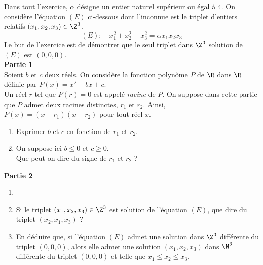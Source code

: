 \documentclass[a4paper,10pt,exos]{nsi}
\begin{document}
    \maketitle


    Dans tout l’exercice, $\alpha$ désigne un entier naturel supérieur ou égal à 4.
    On considère l’équation $(E)$ ci-dessous dont l’inconnue est le triplet d’entiers relatifs $(x_1, x_2, x_3) \in\Z^3$.
    $$(E): \quad x_1^2+x_2^2+x_3^2=\alpha x_1 x_2 x_3$$
    Le but de l’exercice est de démontrer que le seul triplet dans $\Z^3$ solution de $(E)$ est $(0,0,0)$.\\
    
    \textbf{Partie 1}\\
    Soient $b$ et $c$ deux réels. On considère la fonction polynôme $𝑃$ de $\R$ dans $\R$ définie par $P(x) = x^2 + bx + c$.\\
    Un réel $r$ tel que $P(r) = 0$ est appelé \textit{racine} de $P$. On suppose dans cette partie que $P$ admet deux racines distinctes, $r_1$ et $r_2$. Ainsi, $P(x) = (x − r_1)(x − r_2)$ pour tout réel $x$.
    \begin{enumerate}
        \item Exprimer $b$ et $c$ en fonction de $r_1$ et $r_2$.
        \item On suppose ici $b\leqslant 0$ et $c\geqslant 0$.\\
            Que peut-on dire du signe de $r_1$ et $r_2$ ?
    \end{enumerate}

    \textbf{Partie 2}
    \begin{enumerate}
        \item {}
        \item Si le triplet $(x_1, x_2, x_3) \in\Z^3$ est solution de l'équation $(E)$, que dire du triplet $(x_2, x_1, x_3)$ ?
        \item En déduire que, si l’équation $(E)$ admet une solution dans $\Z^3$ différente du triplet $(0,0,0)$, alors elle admet une solution $(x_1, x_2, x_3)$ dans $\N^3$ différente du triplet $(0,0,0)$ et telle que $x_1\leqslant x_2\leqslant x_3$.
    \end{enumerate}
\end{document}
